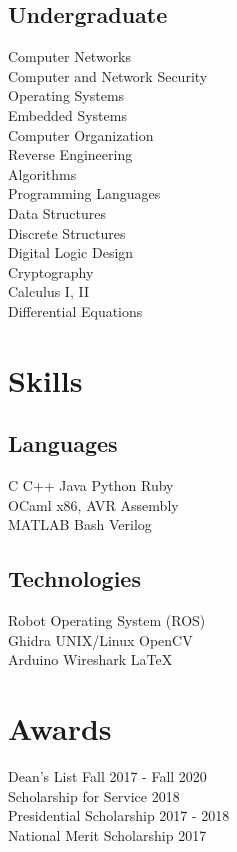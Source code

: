 \documentclass[]{deedy-resume-openfont}
\begin{document}
\begin{minipage}[t]{0.33\textwidth}
\subsection{Undergraduate}
Computer Networks\\
Computer and Network Security\\
Operating Systems\\
Embedded Systems\\
Computer Organization\\
Reverse Engineering\\
Algorithms\\
Programming Languages\\
Data Structures\\
Discrete Structures\\
Digital Logic Design\\
Cryptography\\
Calculus I, II\\
Differential Equations\\


\section{Skills}
\subsection{Languages}
C \textbullet{} C++ \textbullet{} Java \textbullet{} Python
\textbullet{} Ruby\\
OCaml \textbullet{} x86, AVR Assembly\\
MATLAB \textbullet{} Bash \textbullet{} Verilog
\subsection{Technologies}
Robot Operating System (ROS)\\
Ghidra \textbullet{} UNIX/Linux \textbullet{} OpenCV \\
Arduino \textbullet{} Wireshark \textbullet{} \LaTeX\\
\sectionsep

\section{Awards}
Dean's List \textbullet{} Fall 2017 - Fall 2020\\
Scholarship for Service \textbullet{} 2018\\
Presidential Scholarship \textbullet{} 2017 - 2018\\
National Merit Scholarship \textbullet{} 2017


\end{minipage}
\end{document}
